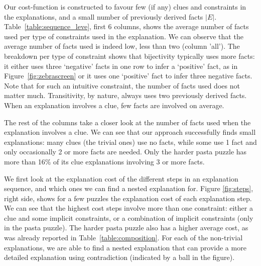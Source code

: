 Our cost-function is constructed to favour few (if any) clues and constraints in the explanations, and a small number of previously derived facts $|E|$.
Table~\ref{table:sequence_leve}, first 6 columns, shows the average number of facts used per type of constraints used in the explanation.
We can observe that the average number of facts used is indeed low, less than two (column 'all').
The breakdown per type of constraint shows that bijectivity typically uses more facts: it either uses three `negative' facts in one row to infer a `positive' fact, as in Figure~\ref{fig:zebrascreen} or it uses one `positive' fact to infer three negative facts.
Note that for such an intuitive constraint, the number of facts used does not matter much. Transitivity, by nature, always uses two previously derived facts.
When an explanation involves a clue, few facts are involved on average.

The rest of the columns take a closer look at the number of facts used when the explanation involves a clue. We can see that our approach successfully finds small explanations: many clues (the trivial ones) use no facts, while some use 1 fact and only occasionally 2 or more facts are needed. Only the harder pasta puzzle has more than 16\% of its clue explanations involving 3 or more facts.

We first look at the explanation cost of the different steps in an explanation sequence, and which ones we can find a nested explanation for. Figure \ref{fig:steps}, right side, shows for a few puzzles the explanation cost of each explanation step. We can see that the highest cost steps involve more than one constraint: either a clue and some implicit constraints, or a combination of implicit constraints (only in the pasta puzzle). The harder pasta puzzle also has a higher average cost, as was already reported in Table~\ref{table:composition}. For each of the non-trivial explanations, we are able to find a nested explanation that can provide a more detailed explanation using contradiction (indicated by a ball in the figure).


